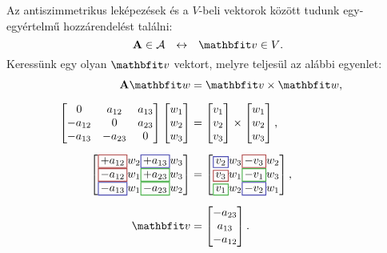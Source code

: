 \documentclass[lang=magyar]{math-handout}
\begin{document}
\begin{note}
  Az antiszimmetrikus leképezések és a $V$-beli vektorok között tudunk
  egy-egyértelmű hozzárendelést találni:
  \[
    \rmat{A} \in \mathcal{A}
    \hspace{2.5mm} \leftrightarrow \hspace{2.5mm}
    \rvec{v} \in V
    \text.
  \]
  Keressünk egy olyan $\rvec{v}$ vektort,
  melyre teljesül az alábbi egyenlet:
  \begin{align*}
    \rmat{A}\rvec{w}
     & = \rvec{v} \times \rvec{w}
    \text,
    \\[2mm]
    \begin{bmatrix}
      0       & a_{12}  & a_{13} \\
      -a_{12} & 0       & a_{23} \\
      -a_{13} & -a_{23} & 0
    \end{bmatrix}
    \begin{bmatrix}
      w_1 \\ w_2 \\ w_3
    \end{bmatrix}
     & =
    \begin{bmatrix}
      v_1 \\ v_2 \\ v_3
    \end{bmatrix}
    \times
    \begin{bmatrix}
      w_1 \\ w_2 \\ w_3
    \end{bmatrix}
    \text,
    \\[2mm]
    \begin{bmatrix}
      \rected{$+a_{12}$}{red}  w_2 \rected{$+a_{13}$}{blue}  w_3 \\
      \rected{$-a_{12}$}{red}  w_1 \rected{$+a_{23}$}{green} w_3 \\
      \rected{$-a_{13}$}{blue} w_1 \rected{$-a_{23}$}{green} w_2
    \end{bmatrix}
     & =
    \begin{bmatrix}
      \rected{$v_2$}{blue}  w_3 \rected{$-v_3$}{red}   w_2 \\
      \rected{$v_3$}{red}   w_1 \rected{$-v_1$}{green} w_3 \\
      \rected{$v_1$}{green} w_2 \rected{$-v_2$}{blue}  w_1
    \end{bmatrix}
    \text,
    \hspace{20mm}
    \\[2mm]
    \rvec{v}
     & =
    \begin{bmatrix}
      -a_{23} \\ a_{13}  \\ -a_{12}
    \end{bmatrix}
    \text.
  \end{align*}
\end{note}
\end{document}
